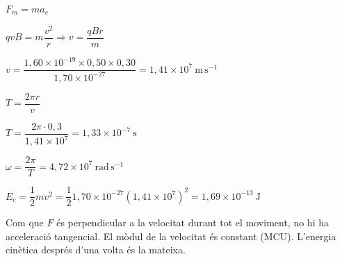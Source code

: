\begin{solapartat}
\begin{minipage}[t]{0.6\linewidth}
\vspace{0pt}
 $F_m = ma_c$

\smallskip
{} $qvB = m\dfrac{v^2}{r} \Rightarrow v = \dfrac{qBr}{m}$

\smallskip
{} $v = \dfrac{1,60\times 10^{-19}\times 0,50\times 0,30}{1,70\times 10^{-27}} = 1,41\times 10^{7}\ \mathrm{m\,s^{-1}}$
\end{minipage}\hfill
\begin{minipage}[t]{0.07\linewidth}
\vspace{0pt}
\end{minipage}
\begin{minipage}[t]{0.3\linewidth}
\vspace{0pt}
\end{minipage}
\end{solapartat}

\begin{solapartat}
 $T = \dfrac{2\pi r}{v}$

\smallskip
{} $T = \dfrac{2\pi\cdot 0,3}{1,41\times 10^{7}} = 1,33\times 10^{-7}\ \mathrm{s}$

\smallskip
{} $\omega = \dfrac{2\pi}{T} = 4,72\times 10^{7}\ \mathrm{rad\,s^{-1}}$

\smallskip
{} $E_c = \dfrac{1}{2}mv^2 = \dfrac{1}{2}1,70\times 10^{-27}\left(1,41\times 10^{7}\right)^2 = 1,69\times 10^{-13}\ \mathrm{J}$

\smallskip
{} Com que $F$ és perpendicular a la velocitat durant tot el moviment, no hi ha acceleració tangencial. El mòdul de la velocitat és constant (MCU). L'energia cinètica després d'una volta és la mateixa.
\end{solapartat}

